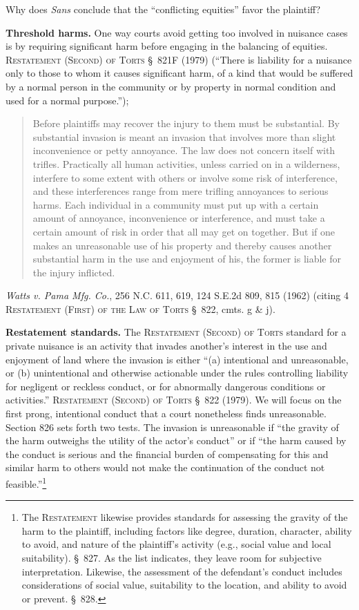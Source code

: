 
\item Why does \textit{Sans} conclude that the ``conflicting equities'' favor
the plaintiff?

\item \textbf{Threshold harms.} One way courts avoid getting too involved in
nuisance cases is by requiring significant harm before engaging in the balancing
of equities. \textsc{Restatement (Second) of Torts} \S~821F (1979) (``There is
liability for a nuisance only to those to whom it causes significant harm, of a
kind that would be suffered by a normal person in the community or by property
in normal condition and used for a normal purpose.''); 
\begin{quote}
Before plaintiffs may recover the injury to them must be substantial. By
substantial invasion is meant an invasion that involves more than slight
inconvenience or petty annoyance. The law does not concern itself with trifles.
Practically all human activities, unless carried on in a wilderness, interfere
to some extent with others or involve some risk of interference, and these
interferences range from mere trifling annoyances to serious harms. Each
individual in a community must put up with a certain amount of annoyance,
inconvenience or interference, and must take a certain amount of risk in order
that all may get on together. But if one makes an unreasonable use of his
property and thereby causes another substantial harm in the use and enjoyment of
his, the former is liable for the injury inflicted.
\end{quote}
\emph{Watts v. Pama Mfg. Co.}, 256 N.C. 611, 619, 124 S.E.2d 809, 815 (1962)
(citing 4 \textsc{Restatement (First) of the Law of Torts} \S~822,
cmts. g \& j).

\item \textbf{Restatement standards.} The \textsc{Restatement (Second) of Torts}
standard for a private nuisance is an activity that invades another's interest
in the use and enjoyment of land where the invasion is either ``(a) intentional
and unreasonable, or (b) unintentional and otherwise actionable under the rules
controlling liability for negligent or reckless conduct, or for abnormally
dangerous conditions or activities.'' \textsc{Restatement (Second) of Torts}
\S~822 (1979). We will focus on the first prong, intentional conduct that a
court nonetheless finds unreasonable. Section 826 sets forth two tests. The
invasion is unreasonable if ``the gravity of the harm outweighs the utility of
the actor's conduct'' or if ``the harm caused by the conduct is serious and the
financial burden of compensating for this and similar harm to others would not
make the continuation of the conduct not feasible.''\footnote{The
\textsc{Restatement} likewise provides standards for assessing the gravity of
the harm to the plaintiff, including factors like degree, duration, character,
ability to avoid, and nature of the plaintiff's activity (e.g., social value and
local suitability). \S~827. As the list indicates, they leave room for
subjective interpretation. Likewise, the assessment of the defendant's conduct
includes considerations of social value, suitability to the location, and
ability to avoid or prevent. \S~828.}

